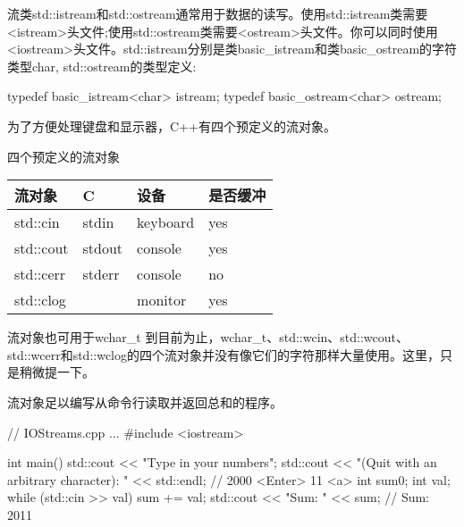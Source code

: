 
流类std::istream和std::ostream通常用于数据的读写。使用std::istream类需要<istream>头文件;使用std::ostream类需要<ostream>头文件。你可以同时使用<iostream>头文件。std::istream分别是类basic\_istream和类basic\_ostream的字符类型char, std::ostream的类型定义:

\begin{cpp}
typedef basic_istream<char> istream;
typedef basic_ostream<char> ostream;
\end{cpp}

为了方便处理键盘和显示器，C++有四个预定义的流对象。

\begin{center}
四个预定义的流对象
\end{center}

\begin{longtable}[c]{|l|l|l|l|}
\hline
\textbf{流对象} & \textbf{C} & \textbf{设备} & \textbf{是否缓冲} \\ \hline
\endfirsthead
%
\endhead
%
std::cin               & stdin              & keyboard        & yes               \\ \hline
std::cout              & stdout             & console         & yes               \\ \hline
std::cerr              & stderr             & console         & no                \\ \hline
std::clog              &                    & monitor         & yes               \\ \hline
\end{longtable}


\begin{myNotic}{流对象也可用于wchar\_t}
到目前为止，wchar\_t、std::wcin、std::wcout、std::wcerr和std::wclog的四个流对象并没有像它们的字符那样大量使用。这里，只是稍微提一下。
\end{myNotic}

流对象足以编写从命令行读取并返回总和的程序。


\begin{cpp}
// IOStreams.cpp
...
#include <iostream>

int main(){
	std::cout << "Type in your numbers";
	std::cout << "(Quit with an arbitrary character): " << std::endl;
				// 2000 <Enter> 11 <a>
	int sum{0};
	int val;
	while (std::cin >> val) sum += val;
	std::cout << "Sum: " << sum; // Sum: 2011
}
\end{cpp}

